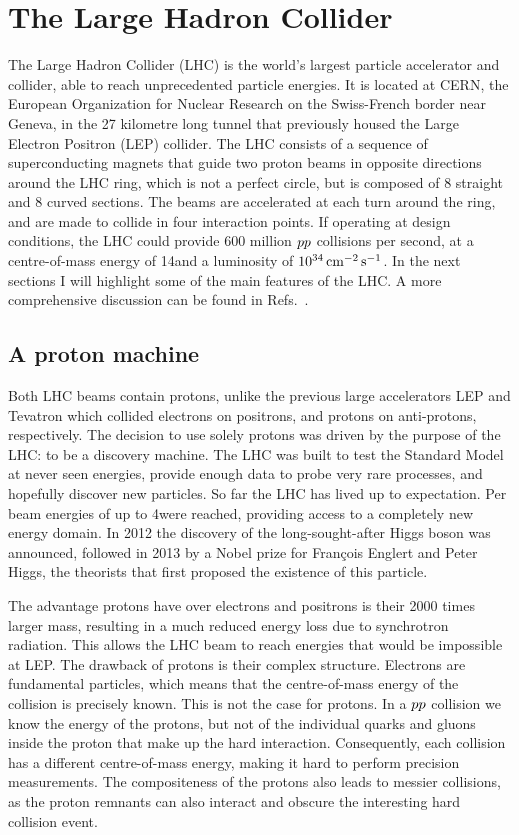 \chapter{The Large Hadron Collider \label{chap:LHC}}

The Large Hadron Collider (LHC) is the world’s largest particle accelerator and collider, able to
reach unprecedented particle energies. It is located at CERN, the European Organization for Nuclear
Research on the Swiss-French border near Geneva, in the 27 kilometre long tunnel that previously
housed the Large Electron Positron (LEP) collider. The LHC consists of a sequence of superconducting
magnets that guide two proton beams in opposite directions around the LHC ring, which is not a
perfect circle, but is composed of 8 straight and 8 curved sections. 
The beams are accelerated at each turn around the ring, and are made to collide in four interaction
points.
If operating at design conditions, the LHC could provide 600 million ${p}{p}$
collisions per second, at a centre-of-mass energy of 14\TeV and a luminosity of
$\text{10}^\text{34}\,\text{cm}^\text{$-$2}\,\text{s}^\text{$-$1}$. 
In the next sections I will highlight some of the main features of the LHC. A more comprehensive
discussion
can be found in Refs.~\cite{Evans:2008zzb,Bruning:2007zzc,Lefevre:1165534,LHC_website}. 

\section{A proton machine \label{sec:LHC_proton_machine}}

Both LHC beams contain protons, unlike the previous large accelerators LEP and Tevatron which
collided electrons on positrons, and protons on anti-protons, respectively. 
The decision to use solely protons was driven by the purpose of the LHC: to be a discovery machine.
The LHC was built to test the Standard Model at never seen energies, provide enough data to
probe very rare processes, and hopefully discover new particles. So far the LHC has lived up to
expectation. Per beam energies of up to 4\TeV were reached, providing access to a completely new
energy domain. In 2012 the discovery of the long-sought-after Higgs boson was announced, followed in
2013 by a Nobel prize for Fran\c{c}ois Englert and Peter Higgs, the theorists that first proposed
the existence of this particle. 

The advantage protons have over electrons and positrons is their 2000 times larger mass, resulting
in a much reduced energy loss due to synchrotron radiation. This allows the LHC beam to reach
energies that would be impossible at LEP.
The drawback of protons is their complex structure. Electrons are fundamental particles, which
means that the centre-of-mass energy of the collision is precisely known. This is not the case for
protons. In a ${p}{p}$ collision we know the energy of the protons, but not of the individual quarks
and gluons inside the proton that make up the hard interaction. Consequently, each collision has a
different centre-of-mass energy, making it hard to perform precision measurements. The compositeness
of the protons also leads to messier collisions, as the proton remnants can also interact and
obscure the interesting hard collision event. 

